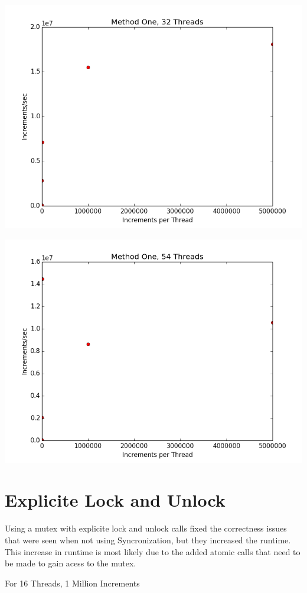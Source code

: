 \documentclass[12pt]{article}
\begin{document}
\includegraphics[scale=.5]{Graphs/MethodOne_32Thread.png}

\includegraphics[scale=.5]{Graphs/MethodOne_54Thread.png}


\section*{Explicite Lock and Unlock}
Using a mutex with explicite lock and unlock calls
fixed the correctness issues that were seen when not
using Syncronization, but they increased the runtime.
This increase in runtime is most likely due to the added atomic
calls that need to be made to gain acess to the mutex.

For 16 Threads, 1 Million Increments
\end{document}
